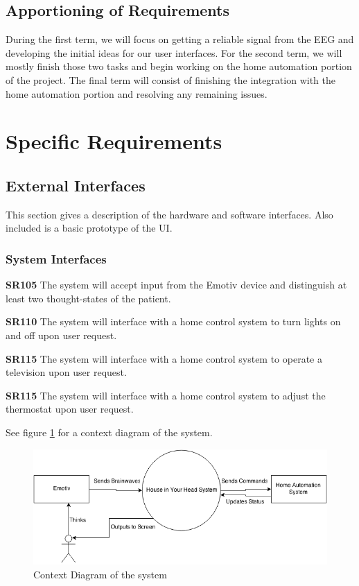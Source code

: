 \documentclass{article}
\begin{document}
\subsection{Apportioning of Requirements}

During the first term, we will focus on getting a reliable signal from the EEG
and developing the initial ideas for our user interfaces. For the second term,
we will mostly finish those two tasks and begin working on the home automation
portion of the project. The final term will consist of finishing the
integration with the home automation portion and resolving any remaining
issues.

\newpage

\section{Specific Requirements}

\subsection{External Interfaces}

This section gives a description of the hardware and software interfaces. Also included is a basic prototype of the UI.

\subsubsection{System Interfaces}

\textbf{SR105} The system will accept input from the Emotiv device and
distinguish at least two thought-states of the patient.

\textbf{SR110} The system will interface with a home control system to turn
lights on and off upon user request.

\textbf{SR115} The system will interface with a home control system to operate
a television upon user request.

\textbf{SR115} The system will interface with a home control system to adjust
the thermostat upon user request.

See figure \ref{fig:contextdia} for a context diagram of the system.

\begin{figure}
\includegraphics[width=\textwidth]{Senior_Design_Context_Diagram_V1.png}
\caption{Context Diagram of the system}
\label{fig:contextdia}
\end{figure}
\end{document}
